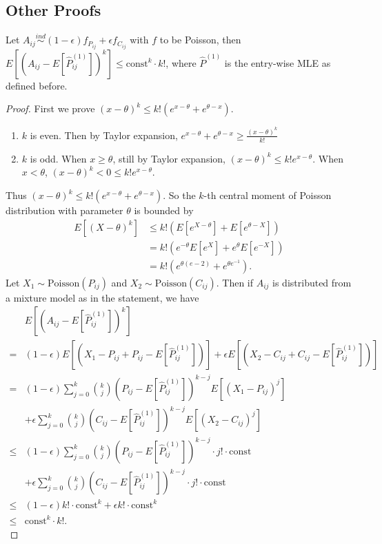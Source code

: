 \subsection{Other Proofs}
\label{section:pf_other}

\begin{lemma}
\label{lm:poisson}
Let $A_{ij} \stackrel{ind}{\sim} (1-\epsilon) f_{P_{ij}} + \epsilon f_{C_{ij}}$ with $f$ to be Poisson, then $E[(A_{ij} - E[\hat{P}_{ij}^{(1)}])^k] \le \mathrm{const}^k \cdot k!$, where $\hat{P}^{(1)}$ is the entry-wise MLE as defined before.
\end{lemma}
\begin{proof}
First we prove $(x - \theta)^k \le k! (e^{x-\theta} + e^{\theta - x})$.
\begin{enumerate}
\item $k$ is even. Then by Taylor expansion, $e^{x - \theta} + e^{\theta - x} \ge \frac{(x-\theta)^k}{k!}$
\item $k$ is odd. When $x \ge \theta$, still by Taylor expansion, $(x-\theta)^k \le k! e^{x-\theta}$. When $x < \theta$, $(x-\theta)^k < 0 \le k! e^{x-\theta}$.
\end{enumerate}
Thus $(x - \theta)^k \le k! (e^{x-\theta} + e^{\theta - x})$.
So the $k$-th central moment of Poisson distribution with parameter $\theta$ is bounded by
\begin{align*}
E[(X-\theta)^k] & \le k! \left( E[e^{X-\theta}] + E[e^{\theta - X}] \right) \\
& = k! \left( e^{-\theta} E[e^X] + e^{\theta} E[e^{-X}] \right) \\
& = k! \left( e^{\theta(e - 2)} + e^{\theta e^{-1}} \right).
\end{align*}
Let $X_1 \sim \mathrm{Poisson}(P_{ij})$ and $X_2 \sim \mathrm{Poisson}(C_{ij})$.
Then if $A_{ij}$ is distributed from a mixture model as in the statement, we have
\begin{align*}
& E[(A_{ij} - E[\hat{P}_{ij}^{(1)}])^k] \\
= & (1-\epsilon) E[(X_1 - P_{ij} + P_{ij} - E[\hat{P}_{ij}^{(1)}])] +
\epsilon E[(X_2 - C_{ij} + C_{ij} - E[\hat{P}_{ij}^{(1)}])] \\
= & (1-\epsilon) \sum_{j = 0}^k \binom{k}{j} (P_{ij} - E[\hat{P}_{ij}^{(1)}])^{k - j} E[(X_1 - P_{ij})^j] \\
& + \epsilon \sum_{j = 0}^k \binom{k}{j} (C_{ij} - E[\hat{P}_{ij}^{(1)}])^{k - j} E[(X_2 - C_{ij})^j] \\
\le & (1-\epsilon) \sum_{j = 0}^k \binom{k}{j} (P_{ij} - E[\hat{P}_{ij}^{(1)}])^{k - j} \cdot j! \cdot \mathrm{const} \\
& + \epsilon \sum_{j = 0}^k \binom{k}{j} (C_{ij} - E[\hat{P}_{ij}^{(1)}])^{k - j} \cdot j! \cdot \mathrm{const} \\ 
\le & (1-\epsilon) k! \cdot \mathrm{const}^k + \epsilon k! \cdot \mathrm{const}^k \\
\le & \mathrm{const}^k \cdot k!.
\end{align*}
\end{proof}

